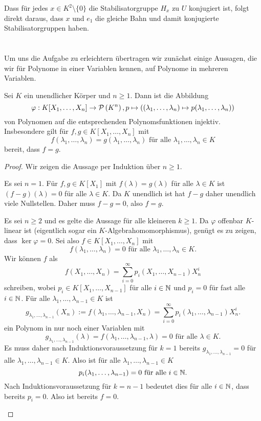 \documentclass[a4paper,10pt]{article}
\begin{document}
Dass für jedes $x \in K^2 \setminus \{0\}$ die Stabilisatorgruppe $H_x$ zu $U$ konjugiert ist, folgt direkt daraus, dass $x$ und $e_1$ die gleiche Bahn und damit konjugierte Stabilisatorgruppen haben.





\section{}
Um uns die Aufgabe zu erleichtern übertragen wir zunächst einige Aussagen, die wir für Polynome in einer Variablen kennen, auf Polynome in mehreren Variablen.


\begin{lem}\label{lem: Polyome Polynomsfunktionen}
 Sei $K$ ein unendlicher Körper und $n \geq 1$. Dann ist die Abbildung
 \[
  \varphi: K[X_1, \ldots, X_n] \to \mathcal{P}\left(K^n\right), p \mapsto ((\lambda_1, \ldots, \lambda_n) \mapsto p(\lambda_1, \ldots, \lambda_n))
 \]
 von Polynomen auf die entsprechenden Polynomsfunktionen injektiv. Insbesondere gilt für $f, g \in K[X_1, \ldots, X_n]$ mit
 \[
  f(\lambda_1, \ldots, \lambda_n) = g(\lambda_1, \ldots, \lambda_n) \text{ für alle } \lambda_1, \ldots, \lambda_n \in K
 \]
 bereit, dass $f = g$.
\end{lem}
\begin{proof}
 Wir zeigen die Aussage per Induktion über $n \geq 1$.
 \begin{ia}
  Es sei $n = 1$. Für $f,g \in K[X_1]$ mit $f(\lambda) = g(\lambda)$ für alle $\lambda \in K$ ist $(f-g)(\lambda) = 0$ für alle $\lambda \in K$. Da $K$ unendlich ist hat $f-g$ daher unendlich viele Nullstellen. Daher muss $f-g = 0$, also $f = g$.
 \end{ia}
 \begin{is}
  Es sei $n \geq 2$ und es gelte die Aussage für alle kleineren $k \geq 1$. Da $\varphi$ offenbar $K$-linear ist (eigentlich sogar ein $K$-Algebrahomomorphismus), genügt es zu zeigen, dass $\ker \varphi = 0$. Sei also $f \in K[X_1, \ldots, X_n]$ mit
  \[
   f(\lambda_1, \ldots, \lambda_n) = 0 \text{ für alle } \lambda_1, \ldots, \lambda_n \in K.
  \]
  Wir können $f$ als
  \[
   f(X_1, \ldots, X_n) = \sum_{i=0}^\infty p_i(X_1, \ldots, X_{n-1}) X_n^i
  \]
  schreiben, wobei $p_i \in K[X_1, \ldots, X_{n-1}]$ für alle $i \in \mathbb{N}$ und $p_i = 0$ für fast alle $i \in \mathbb{N}$. Für alle $\lambda_1, \ldots, \lambda_{n-1} \in K$ ist
  \[
   g_{\lambda_1, \ldots, \lambda_{n-1}}(X_n)
   := f(\lambda_1, \ldots, \lambda_{n-1}, X_n)
   = \sum_{i=0}^\infty p_i(\lambda_1, \ldots, \lambda_{n-1}) X_n^i.
  \]
  ein Polynom in nur noch einer Variablen mit
  \[
   g_{\lambda_1, \ldots, \lambda_{n-1}}(\lambda) = f(\lambda_1, \ldots, \lambda_{n-1}, \lambda) = 0
   \text{ für alle } \lambda \in K.
  \]
  Es muss daher nach Induktionsvoraussetzung für $k=1$ bereits $g_{\lambda_1, \ldots, \lambda_{n-1}} = 0$ für alle $\lambda_1, \ldots, \lambda_{n-1} \in K$. Also ist für alle $\lambda_1, \ldots, \lambda_{n-1} \in K$
  \[
   p_i(\lambda_1, \ldots, \lambda_{n-1}) = 0 \text{ für alle } i \in \mathbb{N}.
  \]
  Nach Induktionsvoraussetzung für $k=n-1$ bedeutet dies für alle $i \in \mathbb{N}$, dass bereits $p_i = 0$. Also ist bereits $f = 0$.
 \end{is}
\end{proof}
\end{document}
